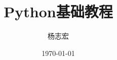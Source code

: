\documentclass[color=gray,base=hide,cn]{elegantbook}
\begin{document}
\frontmatter %

\title{Python基础教程}
\author{杨志宏}
\date{\today}

\maketitle

\tableofcontents

\mainmatter %






\appendix

\end{document}
